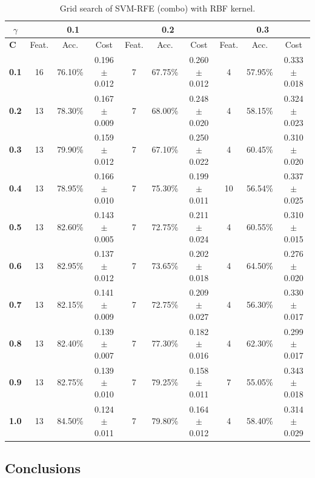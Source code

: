 \begin{table}[h]
{\begin{tabular}{l | c c c|c c c|c c c}
        \toprule
        \multicolumn{1}{c}{$\gamma$} & \multicolumn{3}{c}{\textbf{0.1}} & \multicolumn{3}{c}{\textbf{0.2}} & \multicolumn{3}{c}{\textbf{0.3}}\\
        \midrule
        \textbf{C}&Feat.&Acc.&Cost&Feat.&Acc.&Cost&Feat.&Acc.&Cost \\
        \midrule
        \textbf{0.1} &    16 & 76.10\% & 0.196 $\pm$ 0.012 &     7 & 67.75\% & 0.260 $\pm$ 0.012 &     4 & 57.95\% & 0.333 $\pm$ 0.018\\
        \textbf{0.2} &    13 & 78.30\% & 0.167 $\pm$ 0.009 &     7 & 68.00\% & 0.248 $\pm$ 0.020 &     4 & 58.15\% & 0.324 $\pm$ 0.023\\
        \textbf{0.3} &    13 & 79.90\% & 0.159 $\pm$ 0.012 &     7 & 67.10\% & 0.250 $\pm$ 0.022 &     4 & 60.45\% & 0.310 $\pm$ 0.020\\
        \textbf{0.4} &    13 & 78.95\% & 0.166 $\pm$ 0.010 &     7 & 75.30\% & 0.199 $\pm$ 0.011 &    10 & 56.54\% & 0.337 $\pm$ 0.025\\
        \textbf{0.5} &    13 & 82.60\% & 0.143 $\pm$ 0.005 &     7 & 72.75\% & 0.211 $\pm$ 0.024 &     4 & 60.55\% & 0.310 $\pm$ 0.015\\
        \textbf{0.6} &    13 & 82.95\% & 0.137 $\pm$ 0.012 &     7 & 73.65\% & 0.202 $\pm$ 0.018 &     4 & 64.50\% & 0.276 $\pm$ 0.020\\
        \textbf{0.7} &    13 & 82.15\% & 0.141 $\pm$ 0.009 &     7 & 72.75\% & 0.209 $\pm$ 0.027 &     4 & 56.30\% & 0.330 $\pm$ 0.017\\
        \textbf{0.8} &    13 & 82.40\% & 0.139 $\pm$ 0.007 &     7 & 77.30\% & 0.182 $\pm$ 0.016 &     4 & 62.30\% & 0.299 $\pm$ 0.017\\
        \textbf{0.9} &    13 & 82.75\% & 0.139 $\pm$ 0.010 &     7 & 79.25\% & 0.158 $\pm$ 0.011 &     7 & 55.05\% & 0.343 $\pm$ 0.018\\
        \textbf{1.0} &    13 & 84.50\% & 0.124 $\pm$ 0.011 &     7 & 79.80\% & 0.164 $\pm$ 0.012 &     4 & 58.40\% & 0.314 $\pm$ 0.029\\
        \bottomrule
    \end{tabular}
    }
    \caption{Grid search of SVM-RFE (combo) with RBF kernel.}
    \label{fig:ch5.combo.madelon.table-rbf}
\end{table}

\subsection{Conclusions}

